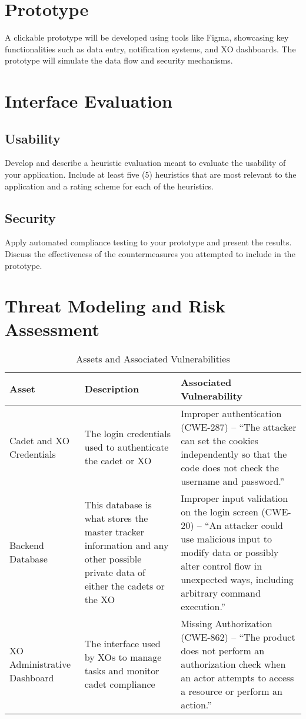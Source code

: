 \documentclass [11pt]{article}
\begin{document}
\section{Prototype}
A clickable prototype will be developed using tools like Figma, showcasing key functionalities such as data entry, notification systems, and XO dashboards. The prototype will simulate the data flow and security mechanisms.

\section{Interface Evaluation}
\subsection{Usability}
Develop and describe a heuristic evaluation meant to evaluate the usability of your application. Include at least five (5) heuristics that are most relevant to the application and a rating scheme for each of the heuristics.
\subsection{Security}
Apply automated compliance testing to your prototype and present the results. Discuss the effectiveness of the countermeasures you attempted to include in the prototype.

\section{Threat Modeling and Risk Assessment}

\begin{table}[H]
\centering
\begin{tabular}{|p{4cm}|p{5.5cm}|p{6.5cm}|}
\hline
\textbf{Asset} & \textbf{Description} & \textbf{Associated Vulnerability} \\
\hline
Cadet and XO Credentials & The login credentials used to authenticate the cadet or XO & Improper authentication (CWE-287) – “The attacker can set the cookies independently so that the code does not check the username and password.” \\
\hline
Backend Database & This database is what stores the master tracker information and any other possible private data of either the cadets or the XO & Improper input validation on the login screen (CWE-20) – “An attacker could use malicious input to modify data or possibly alter control flow in unexpected ways, including arbitrary command execution.” \\
\hline
XO Administrative Dashboard & The interface used by XOs to manage tasks and monitor cadet compliance & Missing Authorization (CWE-862) – “The product does not perform an authorization check when an actor attempts to access a resource or perform an action.” \\
\hline
\end{tabular}
\caption{Assets and Associated Vulnerabilities}
\end{table}
\end{document}
